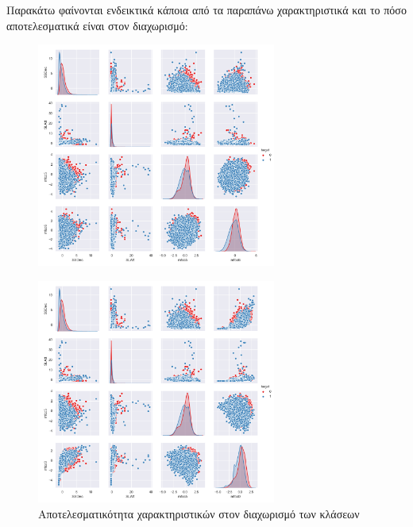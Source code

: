 \par Παρακάτω φαίνονται ενδεικτικά κάποια από τα παραπάνω χαρακτηριστικά και το πόσο αποτελεσματικά είναι στον διαχωρισμό:

\begin{figure}[H]
\centering
\includegraphics[width=0.7\textwidth]{figure_1.png}
\end{figure}
\begin{figure}[h]
\centering
\includegraphics[width=0.7\textwidth]{figure_2.png}
\caption{Αποτελεσματικότητα χαρακτηριστικών στον διαχωρισμό των κλάσεων}
\end{figure}


